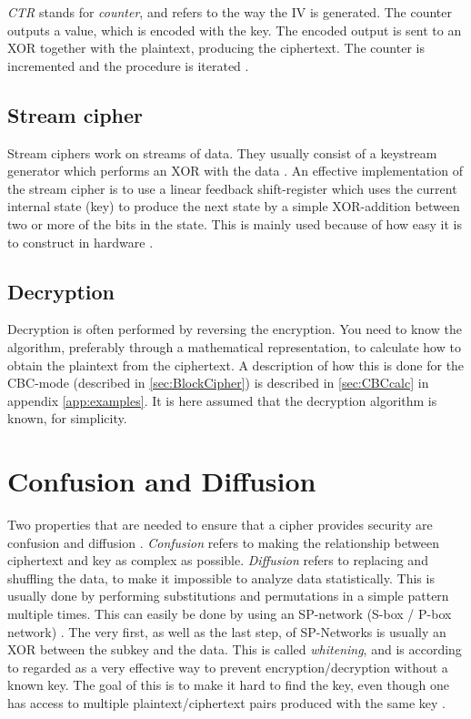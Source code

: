 \emph{CTR} stands for \emph{counter}, and refers to the way the IV is 
generated. The counter outputs a value, which is encoded with the key. 
The encoded output is sent to an XOR together with the plaintext, 
producing the ciphertext. The counter is incremented and the procedure 
is iterated \citep[p. 111]{Stinson:2006}.

\subsection{Stream cipher} \label{sec:StreamCipher}
Stream ciphers work on streams of data. They usually consist of a 
keystream generator which performs an XOR with the data 
\cite[pp. 67]{Simmons:1992}. An effective implementation of the stream 
cipher is to use a linear feedback shift-register which uses the 
current internal state (key) to produce the next state by a simple 
XOR-addition between two or more of the bits in the state. This is 
mainly used because of how easy it is to construct in hardware 
\citep{LFSR:2008}.

\subsection{Decryption}
Decryption is often performed by reversing the encryption. You need to 
know the algorithm, preferably through a mathematical representation, 
to calculate how to obtain the plaintext from the ciphertext. A 
description of how this is done for the CBC-mode (described in 
\ref{sec:BlockCipher}) is described in \ref{sec:CBCcalc} in appendix 
\ref{app:examples}. It is here assumed that the decryption algorithm 
is known, for simplicity. 
\section{Confusion and Diffusion}\label{ch:ConfDiff}
Two properties that are needed to ensure that a cipher provides 
security are confusion and diffusion \citep{Shannon:1949}. 
\emph{Confusion} refers to making the relationship between ciphertext 
and key as complex as possible. \emph{Diffusion} refers to replacing 
and shuffling the data, to make it impossible to analyze data 
statistically. This is usually done by performing substitutions and 
permutations in a simple pattern multiple times. This can easily be 
done by using an SP-network (S-box / P-box network) 
\citep[pp. 74--79]{Stinson:2006}. The very first, as well as the last 
step, of SP-Networks is usually an XOR between the subkey and the data. 
This is called \emph{whitening}, and is according to 
\citet[p. 75]{Stinson:2006} regarded as a very effective way to prevent 
encryption/decryption without a known key. The goal of this is to make 
it hard to find the key, even though one has access to multiple 
plaintext/ciphertext pairs produced with the same key 
\citep{Shannon:1949}.

